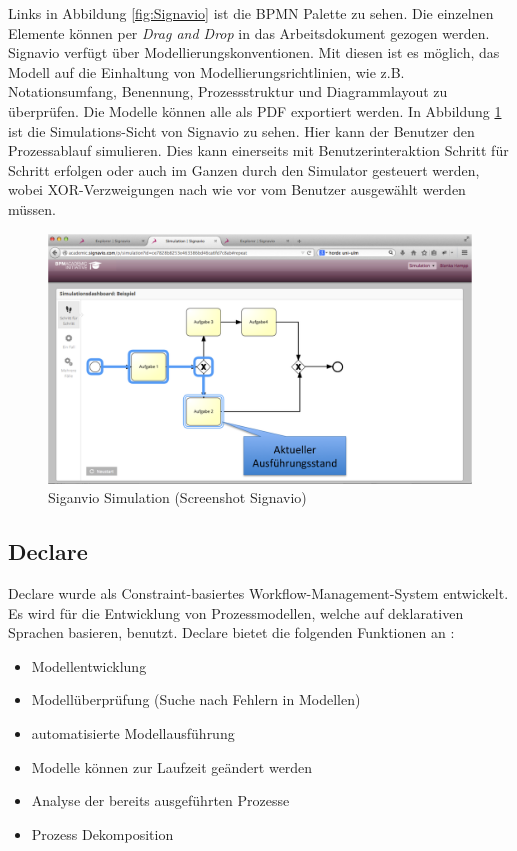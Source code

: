 Links in Abbildung \ref{fig:Signavio} ist die BPMN Palette zu sehen. Die einzelnen Elemente können per \textit{Drag and Drop} in das Arbeitsdokument gezogen werden. Signavio verfügt über Modellierungskonventionen. Mit diesen ist es  möglich, das Modell auf die Einhaltung von Modellierungsrichtlinien, wie z.B. Notationsumfang, Benennung, Prozessstruktur und Diagrammlayout zu überprüfen. Die Modelle können alle als PDF exportiert werden. \newline
In Abbildung \ref{fig:Simulation} ist die Simulations-Sicht von Signavio zu sehen. Hier kann der Benutzer den Prozessablauf simulieren. Dies kann einerseits mit Benutzerinteraktion Schritt für Schritt erfolgen oder auch im Ganzen durch den Simulator gesteuert werden, wobei XOR-Verzweigungen nach wie vor vom Benutzer ausgewählt werden müssen.
\begin{figure}[H]
\begin{center}
  \includegraphics[scale=0.6]{Simulation} %
  \caption{Siganvio Simulation (Screenshot Signavio)}
  \label{fig:Simulation}
\end{center}
\end{figure} 



\subsection{Declare}

Declare wurde als Constraint-basiertes Workflow-Management-System entwickelt. Es wird für die Entwicklung von Prozessmodellen, welche auf deklarativen Sprachen basieren, benutzt. Declare bietet die folgenden Funktionen an \cite{pesic2007declare}:
\begin {itemize}
\item Modellentwicklung
\item Modellüberprüfung (Suche nach Fehlern in Modellen)
\item automatisierte Modellausführung
\item Modelle können zur Laufzeit geändert werden
\item Analyse der bereits ausgeführten Prozesse
\item Prozess Dekomposition
\end {itemize}

